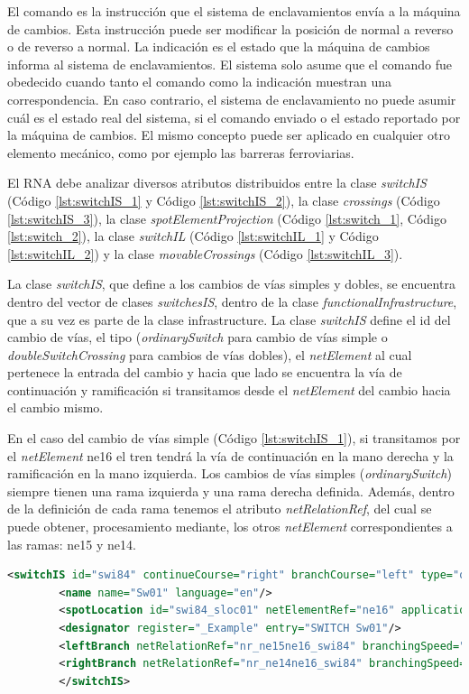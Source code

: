     El comando es la instrucción que el sistema de enclavamientos envía a la máquina de cambios. Esta instrucción puede ser modificar la posición de normal a reverso o de reverso a normal. La indicación es el estado que la máquina de cambios informa al sistema de enclavamientos. El sistema solo asume que el comando fue obedecido cuando tanto el comando como la indicación muestran una correspondencia. En caso contrario, el sistema de enclavamiento no puede asumir cuál es el estado real del sistema, si el comando enviado o el estado reportado por la máquina de cambios. El mismo concepto puede ser aplicado en cualquier otro elemento mecánico, como por ejemplo las barreras ferroviarias.

    El RNA debe analizar diversos atributos distribuidos entre la clase \textit{switchIS} (Código \ref{lst:switchIS_1} y Código \ref{lst:switchIS_2}), la clase \textit{crossings} (Código \ref{lst:switchIS_3}), la clase \textit{spotElementProjection} (Código \ref{lst:switch_1}, Código \ref{lst:switch_2}), la clase \textit{switchIL} (Código \ref{lst:switchIL_1} y Código \ref{lst:switchIL_2}) y la clase \textit{movableCrossings} (Código \ref{lst:switchIL_3}). 
    
    La clase \textit{switchIS}, que define a los cambios de vías simples y dobles, se encuentra dentro del vector de clases \textit{switchesIS}, dentro de la clase \textit{functionalInfrastructure}, que a su vez es parte de la clase infrastructure. La clase \textit{switchIS} define el id del cambio de vías, el tipo (\textit{ordinarySwitch} para cambio de vías simple o \textit{doubleSwitchCrossing} para cambios de vías dobles), el \textit{netElement} al cual pertenece la entrada del cambio y hacia que lado se encuentra la vía de continuación y ramificación si transitamos desde el \textit{netElement} del cambio hacia el cambio mismo. 
    
    En el caso del cambio de vías simple (Código \ref{lst:switchIS_1}), si transitamos por el \textit{netElement} ne16 el tren tendrá la vía de continuación en la mano derecha y la ramificación en la mano izquierda. Los cambios de vías simples (\textit{ordinarySwitch}) siempre tienen una rama izquierda y una rama derecha definida. Además, dentro de la definición de cada rama tenemos el atributo \textit{netRelationRef}, del cual se puede obtener, procesamiento mediante, los otros \textit{netElement} correspondientes a las ramas: ne15 y ne14. 
    
    \begin{lstlisting}[language = XML, caption = Clase \textit{switchIS} (ordinarySwitch) , label = {lst:switchIS_1}]
    	<switchIS id="swi84" continueCourse="right" branchCourse="left" type="ordinarySwitch">
    	<name name="Sw01" language="en"/>
    	<spotLocation id="swi84_sloc01" netElementRef="ne16" applicationDirection="reverse" intrinsicCoord="0.0000"/>
    	<designator register="_Example" entry="SWITCH Sw01"/>
    	<leftBranch netRelationRef="nr_ne15ne16_swi84" branchingSpeed="0" joiningSpeed="0" radius="-500"/>
    	<rightBranch netRelationRef="nr_ne14ne16_swi84" branchingSpeed="0" joiningSpeed="0" radius="0"/>
    	</switchIS>
    \end{lstlisting}
    
